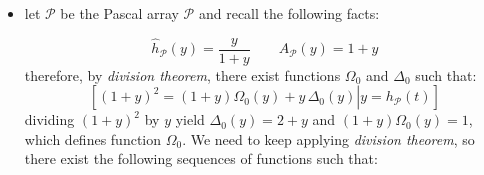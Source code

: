 \begin{itemize}

    \item let $\mathcal{P}$ be the Pascal array $\mathcal{P}$ and recall 
        the following facts:
        
        \begin{displaymath} 
            \hat{h}_{\mathcal{P}}(y)=\frac{y}{1+y} \quad\quad A_{\mathcal{P}}(y)=1+y
        \end{displaymath} 
        therefore, by \emph{division theorem}, 
        there exist functions $\Omega_{0}$ and $\Delta_{0}$ such that:
        \begin{displaymath}
            \left.\left[
                (1+y)^2 =  (1+y)\Omega_{0}(y) + y\,\Delta_{0}(y) \right| y = h_{\mathcal{P}}(t) \right]
        \end{displaymath}
        dividing $(1+y)^2$ by $y$ yield $\Delta_{0}(y)=2+y$ and $(1+y)\Omega_{0}(y)=1$, 
        which defines function $\Omega_{0}$. We need to 
        keep applying \emph{division theorem}, so there exist the following
        sequences of functions such that:


\end{itemize}
